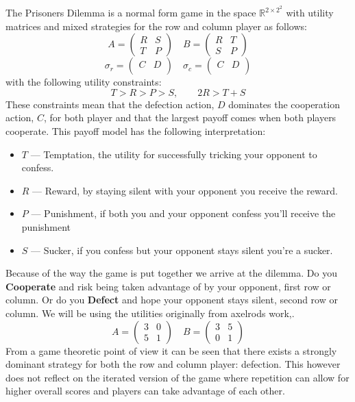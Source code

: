 The Prisoners Dilemma is a normal form game in the space $\mathbb{R}^{{2\times 2}^2}$ with utility matrices and mixed strategies for the row and column player as follows:
$$
    A=\begin{pmatrix}R & S\\ T & P\end{pmatrix}\quad
    B=\begin{pmatrix}R & T\\ S & P\end{pmatrix}
$$
$$
    \sigma_r=\begin{pmatrix}C & D\\ \end{pmatrix}\quad
    \sigma_c=\begin{pmatrix}C & D\\ \end{pmatrix}
$$
with the following utility constraints:
$$T>R>P>S, \qquad 2R>T+S$$
These constraints mean that the defection action, $D$ dominates the cooperation action, $C$, for both player and that the largest payoff comes when both players cooperate. This payoff model has the following interpretation:
\begin{itemize}
    \item $T$ --- Temptation, the utility for successfully tricking your opponent to confess.
    \item $R$ --- Reward, by staying silent with your opponent you receive the reward.
    \item $P$ --- Punishment, if both you and your opponent confess you'll receive the punishment
    \item $S$ --- Sucker, if you confess but your opponent stays silent you're a sucker.
\end{itemize}
Because of the way the game is put together we arrive at the dilemma.
Do you \textbf{Cooperate} and risk being taken advantage of by your opponent, first row or column.
Or do you \textbf{Defect} and hope your opponent stays silent, second row or column.
We will be using the utilities originally from axelrods work,\cite{axelrod1980effective}.
$$
    A=\begin{pmatrix}3 & 0 \\ 5 & 1\end{pmatrix}\quad
    B=\begin{pmatrix}3 & 5 \\ 0 & 1\end{pmatrix}
$$    
From a game theoretic point of view it can be seen that there exists a strongly dominant strategy for both the row and column player: defection.
This however does not reflect on the iterated version of the game where repetition can allow for higher overall scores and players can take advantage of each other.

